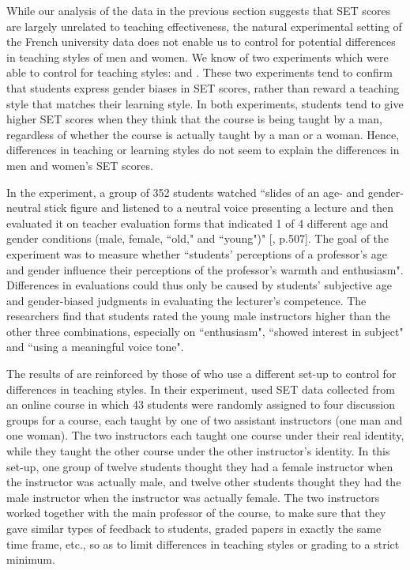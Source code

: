 \documentclass[12pt]{article}
\begin{document}
While our analysis of the data in the previous section suggests that SET scores are largely unrelated to teaching effectiveness, the natural experimental setting of the French university data does not enable us to control for potential differences in teaching styles of men and women. We know of two experiments which were able to control for teaching styles: \citet{Arbuckle2003} and \citet{MacNell2014}. These two experiments tend to confirm that students express gender biases in SET scores, rather than reward a teaching style that matches their learning style. In both experiments, students tend to give higher SET scores when they think that the course is being taught by a man, regardless of whether the course is actually taught by a man or a woman. Hence, differences in teaching or learning styles do not seem to explain the differences in men and women's SET scores.

In the \citet{Arbuckle2003} experiment, a group of 352 students watched \textquotedblleft slides of an age- and gender-neutral stick figure and listened to a neutral voice presenting a lecture and then evaluated it on teacher evaluation forms that indicated 1 of 4 different age and gender conditions (male, female, \textquotedblleft old," and \textquotedblleft young")" [\citealp{Arbuckle2003}, p.507]. The goal of the experiment was to measure whether \textquotedblleft students' perceptions of a professor's age and gender influence their perceptions of the professor's warmth and enthusiasm". Differences in evaluations could thus only be caused by students' subjective age and gender-biased judgments in evaluating the lecturer's competence. The researchers find that students rated the young male instructors higher than the other three combinations, especially on \textquotedblleft enthusiasm", \textquotedblleft showed interest in subject"  and \textquotedblleft using a meaningful voice tone". 

The results of \citet{Arbuckle2003} are reinforced by those of \citet{MacNell2014} who use a different set-up to control for differences in teaching styles. In their experiment, \citet{MacNell2014} used SET data collected from an online course in which 43 students were randomly assigned to four discussion groups for a course, each taught by one of two assistant instructors (one man and one woman). The two instructors each taught one course under their real identity, while they taught the other course under the other instructor's identity. In this set-up, one group of twelve students thought they had a female instructor when the instructor was actually male, and twelve other students thought they had the male instructor when the instructor was actually female. The two instructors worked together with the main professor of the course, to make sure that they gave similar types of feedback to students, graded papers in exactly the same time frame, etc., so as to limit differences in teaching styles or grading to a strict minimum. 
\end{document}
